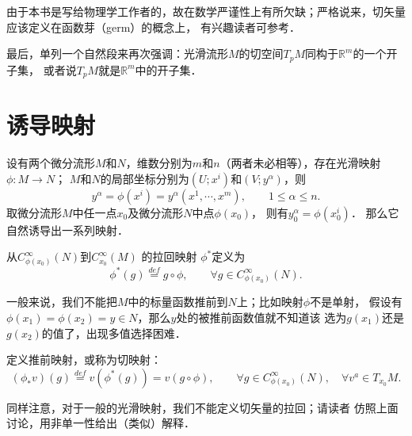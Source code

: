 由于本书是写给物理学工作者的，故在数学严谨性上有所欠缺；严格说来，切矢量应该定义在函数芽（germ）的概念上，
有兴趣读者可参考\parencite[\S 1.2]{cc2001-zh}．

最后，单列一个自然段来再次强调：光滑流形$M$的切空间$T_pM$同构于$\mathbb{R}^m$的一个开子集，
或者说$T_pM$就是$\mathbb{R}^m$中的开子集．





\section{诱导映射}\label{chdm:sec_induced-map}
设有两个微分流形$M$和$N$，维数分别为$m$和$n$（两者未必相等），存在光滑映射$\phi:M\to N$；
$M$和$N$的局部坐标分别为$(U;x^i)$和$(V;y^\alpha)$，则
\begin{equation}
    y^\alpha = \phi(x^i)=y^\alpha (x^1,\cdots, x^m), \qquad 1\leqslant \alpha \leqslant n .
\end{equation}
取微分流形$M$中任一点$x_0$及微分流形$N$中点$\phi(x_0)$，
则有$y^\alpha_0=\phi(x^i_0)$．
那么它自然诱导出一系列映射．
\begin{definition}\label{chdm:def_pullback-scalar}
    从$C^\infty_{\phi(x_0)}(N)$到$C^\infty_{x_0}(M)$
    的{\heiti 拉回映射} $\phi^{*}$定义为
    \begin{equation}
        \phi^{*}(g) \overset{def}{=} g \circ \phi, 
        \qquad \forall g\in C^\infty_{\phi(x_0)}(N) .
    \end{equation}
\end{definition}
一般来说，我们不能把$M$中的标量函数推前到$N$上；比如映射$\phi$不是单射，
假设有$\phi(x_1)=\phi(x_2)=y\in N$，那么$y$处的被推前函数值就不知道该
选为$g(x_1)$还是$g(x_2)$的值了，出现多值选择困难．



\begin{definition}\label{chdm:def_pushforward-vector}
    定义{\heiti 推前映射}，或称为{\heiti 切映射}：
    \begin{equation}
        (\phi_{*}v)(g) \overset{def}{=} v(\phi^{*}(g)) = v (g \circ \phi), 
        \qquad \forall g\in C^\infty_{\phi(x_0)}(N),\quad \forall v^a \in T_{x_0}M .
    \end{equation}
\end{definition}

同样注意，对于一般的光滑映射，我们不能定义切矢量的拉回；请读者
仿照上面讨论，用非单一性给出（类似）解释．

